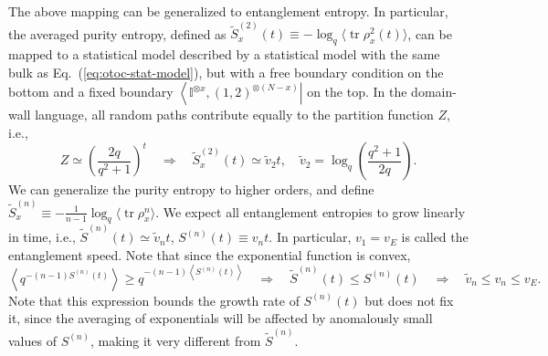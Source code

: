 \documentclass[aps,prb,superscriptaddress,nofootinbib]{revtex4}
\def \tr{\operatorname{tr}}
\begin{document}
The above mapping can be generalized to entanglement entropy.
In particular, the averaged purity entropy, defined as $\tilde S^{(2)}_x(t) \equiv -\log_q \langle \tr\rho_x^2(t)\rangle$, can be mapped to a statistical model described by a statistical model with the same bulk as Eq.~(\ref{eq:otoc-stat-model}), but with a free boundary condition on the bottom and a fixed boundary $\left\langle \mathbb I^{\otimes x},(1,2)^{\otimes (N-x)}\right|$ on the top.
In the domain-wall language, all random paths contribute equally to the partition function $Z$, i.e.,
\begin{equation}
	Z \simeq \left(\frac{2q}{q^2+1}\right)^t
	\quad\Longrightarrow\quad
	\tilde S^{(2)}_x(t) \simeq \tilde v_2 t,\quad
	\tilde v_2 =\log_q\left(\frac{q^2+1}{2q}\right).
\end{equation}
We can generalize the purity entropy to higher orders, and define $\tilde S_x^{(n)} \equiv -\frac{1}{n-1}\log_q\langle \tr\rho_x^n\rangle$.
We expect all entanglement entropies to grow linearly in time, i.e., $\tilde S^{(n)}(t) \simeq \tilde v_n t$, $S^{(n)}(t) \equiv v_n t$.
In particular, $v_1=v_E$ is called the entanglement speed.
Note that since the exponential function is convex, 
\begin{equation}
	\left\langle q^{-(n-1) S^{(n)}(t)} \right\rangle \ge q^{-(n-1)\left\langle S^{(n)}(t)\right\rangle} 
	\quad\Longrightarrow\quad
	\tilde S^{(n)}(t) \le S^{(n)}(t)
	\quad\Longrightarrow\quad
	\tilde v_n \le v_n\le v_E.
\end{equation}
Note that this expression bounds the growth rate of $S^{(n)}(t)$ but does not fix it, since the averaging of exponentials will be affected by anomalously small values of $S^{(n)}$, making it very different from $\tilde S^{(n)}$.
\end{document}
